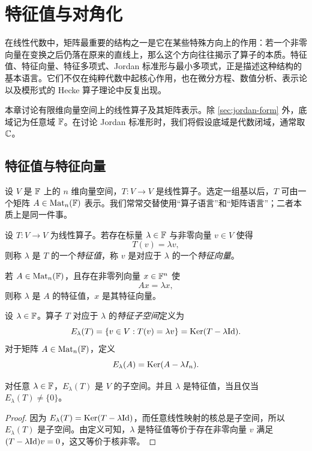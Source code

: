 \chapter{特征值与对角化}

在线性代数中，矩阵最重要的结构之一是它在某些特殊方向上的作用：若一个非零向量在变换之后仍落在原来的直线上，那么这个方向往往揭示了算子的本质。特征值、特征向量、特征多项式、Jordan 标准形与最小多项式，正是描述这种结构的基本语言。它们不仅在纯粹代数中起核心作用，也在微分方程、数值分析、表示论以及模形式的 Hecke 算子理论中反复出现。

本章讨论有限维向量空间上的线性算子及其矩阵表示。除 \cref{sec:jordan-form} 外，底域记为任意域 \(\mathbb{F}\)。在讨论 Jordan 标准形时，我们将假设底域是代数闭域，通常取 \(\mathbb{C}\)。

\section{特征值与特征向量}\label{sec:eigenvalues-vectors}

设 \(V\) 是 \(\mathbb{F}\) 上的 \(n\) 维向量空间，\(T\colon V\to V\) 是线性算子。选定一组基以后，\(T\) 可由一个矩阵 \(A\in \mathrm{Mat}_n(\mathbb{F})\) 表示。我们常常交替使用“算子语言”和“矩阵语言”；二者本质上是同一件事。

\begin{definition}
设 \(T\colon V\to V\) 为线性算子。若存在标量 \(\lambda\in \mathbb{F}\) 与非零向量 \(v\in V\) 使得
\[
T(v)=\lambda v,
\]
则称 \(\lambda\) 是 \(T\) 的一个\emph{特征值}，称 \(v\) 是对应于 \(\lambda\) 的一个\emph{特征向量}。

若 \(A\in \mathrm{Mat}_n(\mathbb{F})\)，且存在非零列向量 \(x\in \mathbb{F}^n\) 使
\[
Ax=\lambda x,
\]
则称 \(\lambda\) 是 \(A\) 的特征值，\(x\) 是其特征向量。
\end{definition}

\begin{definition}
设 \(\lambda\in \mathbb{F}\)。算子 \(T\) 对应于 \(\lambda\) 的\emph{特征子空间}定义为
\[
E_\lambda(T)=\{v\in V:T(v)=\lambda v\}=\mathrm{Ker}(T-\lambda \mathrm{Id}).
\]
对于矩阵 \(A\in \mathrm{Mat}_n(\mathbb{F})\)，定义
\[
E_\lambda(A)=\mathrm{Ker}(A-\lambda I_n).
\]
\end{definition}

\begin{proposition}
对任意 \(\lambda\in \mathbb{F}\)，\(E_\lambda(T)\) 是 \(V\) 的子空间。并且 \(\lambda\) 是特征值，当且仅当 \(E_\lambda(T)\neq \{0\}\)。
\end{proposition}

\begin{proof}
因为 \(E_\lambda(T)=\mathrm{Ker}(T-\lambda\mathrm{Id})\)，而任意线性映射的核总是子空间，所以 \(E_\lambda(T)\) 是子空间。由定义可知，\(\lambda\) 是特征值等价于存在非零向量 \(v\) 满足 \((T-\lambda\mathrm{Id})v=0\)，这又等价于核非零。
\end{proof}

